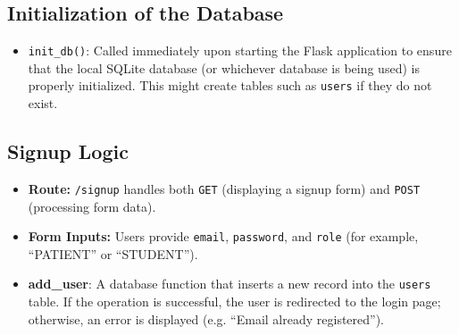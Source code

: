 \subsection{Initialization of the Database}
\begin{itemize}
  \item \texttt{init\_db()}: Called immediately upon starting the Flask application to ensure that the local SQLite
        database (or whichever database is being used) is properly initialized. This might create tables such as
        \texttt{users} if they do not exist.
\end{itemize}

\subsection{Signup Logic}
\label{subsec:signup}
\begin{itemize}
  \item \textbf{Route:} \texttt{/signup} handles both \texttt{GET} (displaying a signup form) and \texttt{POST} (processing form data).
  \item \textbf{Form Inputs:} Users provide \texttt{email}, \texttt{password}, and \texttt{role} (for example, ``PATIENT'' or ``STUDENT'').
  \item \textbf{add\_user}: A database function that inserts a new record into the \texttt{users} table. If the operation
        is successful, the user is redirected to the login page; otherwise, an error is displayed
        (e.g. ``Email already registered'').
\end{itemize}

